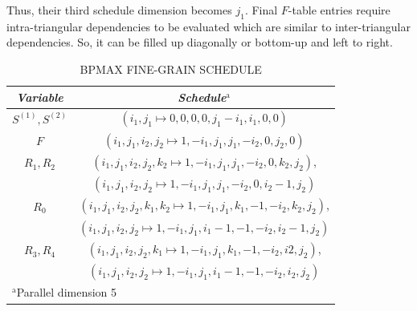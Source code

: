  Thus, their third schedule dimension becomes $j_{1}$. Final $F$-table entries require intra-triangular dependencies to be evaluated which are similar to inter-triangular dependencies. So, it can be filled up diagonally or bottom-up and left to right.
\begin{table}[htbp]
\caption{\uppercase{BPMax fine-grain schedule}}
\begin{center}
\begin{tabular}{|c|c|}
\hline
\textbf{\textit{Variable}}& \textbf{\textit{Schedule}}$^{\mathrm{a}}$ \\
\hline
  $S^{(1)}, S^{(2)}$ & $(i_{1},j_{1} \mapsto 0, 0, 0, 0, j_{1}-i_{1}, i_{1}, 0, 0)$   \\
\cline{1-2} 
  $F$ & $(i_{1},j_{1},i_{2},j_{2} \mapsto 1, -i_{1}, j_{1}, j_{1}, -i_{2}, 0, j_{2},0)$   \\
\cline{1-2} 
$R_{1}, R_{2}$ & $(i_{1},j_{1},i_{2},j_{2},k_{2} \mapsto 1, -i_{1}, j_{1}, j_{1}, -i_{2}, 0, k_{2}, j_{2})$,    \\
 & $(i_{1},j_{1},i_{2},j_{2} \mapsto 1, -i_{1}, j_{1}, j_{1}, -i_{2}, 0, i_{2}-1, j_{2})$ \\
 \cline{1-2} 
 $R_{0}$ & $(i_{1},j_{1},i_{2},j_{2},k_{1},k_{2} \mapsto 1, -i_{1}, j_{1}, k_{1}, -1, -i_{2}, k_{2}, j_{2})$,    \\
  & $(i_{1},j_{1},i_{2},j_{2} \mapsto 1, -i_{1}, j_{1}, i_{1}-1, -1, -i_{2}, i_{2}-1, j_{2})$ \\
\cline{1-2} 
 $R_{3}, R_{4}$ & $(i_{1},j_{1},i_{2},j_{2},k_{1} \mapsto 1, -i_{1}, j_{1}, k_{1}, -1, -i_{2}, i2, j_{2})$,    \\
 & $(i_{1},j_{1},i_{2},j_{2} \mapsto 1, -i_{1}, j_{1}, i_{1}-1, -1, -i_{2}, i_{2}, j_{2})$ \\
 \cline{1-2} 
\hline
\multicolumn{2}{l}{$^{\mathrm{a}}$Parallel dimension 5}
\end{tabular}
\label{tab:bpm_fine_grain_schedule}
\end{center}
\end{table}
